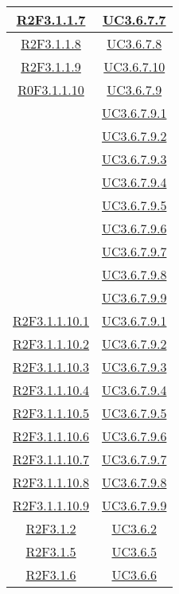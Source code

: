 \begin{longtable}{|c|c|}
\hline
\hyperlink{R2F3.1.1.7}{R2F3.1.1.7} & \hyperlink{UC3.6.7.7}{UC3.6.7.7}\\
\hline
\hyperlink{R2F3.1.1.8}{R2F3.1.1.8} & \hyperlink{UC3.6.7.8}{UC3.6.7.8}\\
\hline
\hyperlink{R2F3.1.1.9}{R2F3.1.1.9} & \hyperlink{UC3.6.7.10}{UC3.6.7.10}\\
\hline
\hyperlink{R0F3.1.1.10}{R0F3.1.1.10} & \hyperlink{UC3.6.7.9}{UC3.6.7.9}\\
& \hyperlink{UC3.6.7.9.1}{UC3.6.7.9.1}\\
& \hyperlink{UC3.6.7.9.2}{UC3.6.7.9.2}\\
& \hyperlink{UC3.6.7.9.3}{UC3.6.7.9.3}\\
& \hyperlink{UC3.6.7.9.4}{UC3.6.7.9.4}\\
& \hyperlink{UC3.6.7.9.5}{UC3.6.7.9.5}\\
& \hyperlink{UC3.6.7.9.6}{UC3.6.7.9.6}\\
& \hyperlink{UC3.6.7.9.7}{UC3.6.7.9.7}\\
& \hyperlink{UC3.6.7.9.8}{UC3.6.7.9.8}\\
& \hyperlink{UC3.6.7.9.9}{UC3.6.7.9.9}\\
\hline
\hyperlink{R2F3.1.1.10.1}{R2F3.1.1.10.1} & \hyperlink{UC3.6.7.9.1}{UC3.6.7.9.1}\\
\hline
\hyperlink{R2F3.1.1.10.2}{R2F3.1.1.10.2} & \hyperlink{UC3.6.7.9.2}{UC3.6.7.9.2}\\
\hline
\hyperlink{R2F3.1.1.10.3}{R2F3.1.1.10.3} & \hyperlink{UC3.6.7.9.3}{UC3.6.7.9.3}\\
\hline
\hyperlink{R2F3.1.1.10.4}{R2F3.1.1.10.4} & \hyperlink{UC3.6.7.9.4}{UC3.6.7.9.4}\\
\hline
\hyperlink{R2F3.1.1.10.5}{R2F3.1.1.10.5} & \hyperlink{UC3.6.7.9.5}{UC3.6.7.9.5}\\
\hline
\hyperlink{R2F3.1.1.10.6}{R2F3.1.1.10.6} & \hyperlink{UC3.6.7.9.6}{UC3.6.7.9.6}\\
\hline
\hyperlink{R2F3.1.1.10.7}{R2F3.1.1.10.7} & \hyperlink{UC3.6.7.9.7}{UC3.6.7.9.7}\\
\hline
\hyperlink{R2F3.1.1.10.8}{R2F3.1.1.10.8} & \hyperlink{UC3.6.7.9.8}{UC3.6.7.9.8}\\
\hline
\hyperlink{R2F3.1.1.10.9}{R2F3.1.1.10.9} & \hyperlink{UC3.6.7.9.9}{UC3.6.7.9.9}\\
\hline
\hyperlink{R2F3.1.2}{R2F3.1.2} & \hyperlink{UC3.6.2}{UC3.6.2}\\
\hline
\hyperlink{R2F3.1.5}{R2F3.1.5} & \hyperlink{UC3.6.5}{UC3.6.5}\\
\hline
\hyperlink{R2F3.1.6}{R2F3.1.6} & \hyperlink{UC3.6.6}{UC3.6.6}\\

\end{longtable}
